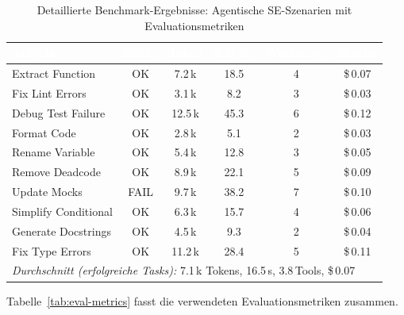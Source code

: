 \begin{table}[ht]
\centering
\caption{Detaillierte Benchmark-Ergebnisse: Agentische SE-Szenarien mit Evaluationsmetriken}
\label{tab:benchmark-results}
\begin{tabularx}{\textwidth}{Xccccc}
\toprule
\cellcolor{headercolor}\textcolor{white}{\textbf{Aufgabe}} & \cellcolor{headercolor}\textcolor{white}{\textbf{Erfolg}} & \cellcolor{headercolor}\textcolor{white}{\textbf{Token}} & \cellcolor{headercolor}\textcolor{white}{\textbf{Zeit (s)}} & \cellcolor{headercolor}\textcolor{white}{\textbf{Werkzeuge}} & \cellcolor{headercolor}\textcolor{white}{\textbf{Kosten}} \\
\midrule
Extract Function & OK & 7.2\,k & 18.5 & 4 & \$\,0.07 \\
\rowcolor{rowcolorgray}
Fix Lint Errors & OK & 3.1\,k & 8.2 & 3 & \$\,0.03 \\
Debug Test Failure & OK & 12.5\,k & 45.3 & 6 & \$\,0.12 \\
\rowcolor{rowcolorgray}
Format Code & OK & 2.8\,k & 5.1 & 2 & \$\,0.03 \\
Rename Variable & OK & 5.4\,k & 12.8 & 3 & \$\,0.05 \\
\rowcolor{rowcolorgray}
Remove Deadcode & OK & 8.9\,k & 22.1 & 5 & \$\,0.09 \\
Update Mocks & FAIL & 9.7\,k & 38.2 & 7 & \$\,0.10 \\
\rowcolor{rowcolorgray}
Simplify Conditional & OK & 6.3\,k & 15.7 & 4 & \$\,0.06 \\
Generate Docstrings & OK & 4.5\,k & 9.3 & 2 & \$\,0.04 \\
\rowcolor{rowcolorgray}
Fix Type Errors & OK & 11.2\,k & 28.4 & 5 & \$\,0.11 \\
\bottomrule
\multicolumn{6}{l}{\small \textit{Durchschnitt (erfolgreiche Tasks):} 7.1\,k Tokens, 16.5\,s, 3.8\,Tools, \$\,0.07} \\
\end{tabularx}
\end{table}

Tabelle~\ref{tab:eval-metrics} fasst die verwendeten Evaluationsmetriken zusammen.

